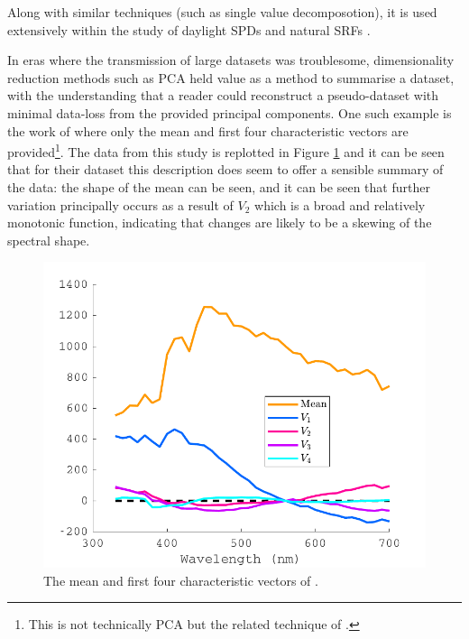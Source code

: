 Along with similar techniques (such as single value decomposotion), it is used extensively within the study of daylight \glspl{SPD} \citep{hernandez-andres_color_2001,ojeda_influence_2012,pant_estimating_2009,bui_group_2004,judd_spectral_1964,maloney_computational_1984,spitschan_variation_2016} and natural \glspl{SRF} \citep{maloney_computational_1984,dzmura_color_1992,maloney_evaluation_1986,maloney_color_1986,cohen_dependency_1964,ferrero_principal_2011,zhang_reconstructing_2008,kwon_surface_2007,agahian_reconstruction_2008,harifi_recovery_2008,parkkinen_characteristic_1989,vrhel_color_1992,fairman_principal_2004,ayala_use_2006,eem_reconstruction_1994-2,connah_multispectral_2006,shi_using_2002,morovic_metamer-set-based_2006}. 


In eras where the transmission of large datasets was troublesome, dimensionality reduction methods such as \gls{PCA} held value as a method to summarise a dataset, with the understanding that a reader could reconstruct a pseudo-dataset with minimal data-loss from the provided principal components. One such example is the work of \citet{judd_spectral_1964} where only the mean and first four characteristic vectors are provided\footnote{This is not technically \gls{PCA} but the related technique of \citet{morris_objective_1954}.}. The data from this study is replotted in Figure \ref{fig:Judd} and it can be seen that for their dataset this description does seem to offer a sensible summary of the data: the shape of the mean can be seen, and it can be seen that further variation principally occurs as a result of $V_{2}$ which is a broad and relatively monotonic function, indicating that changes are likely to be a skewing of the spectral shape.

\begin{figure}[htbp]
 \includegraphics[max width=\textwidth]{figs/LitRev/Judd.pdf}
 \caption{The mean and first four characteristic vectors of \citet{judd_spectral_1964}.}
 \label{fig:Judd}
\end{figure} 